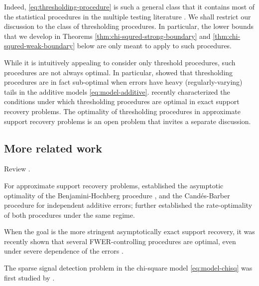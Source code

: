 Indeed, \eqref{eq:thresholding-procedure} is such a general class that it contains most of the statistical procedures in the multiple testing literature \cite{roquain2011type}.
We shall restrict our discussion to the class of thresholding procedures.
In particular, the lower bounds that we develop in Theorems \ref{thm:chi-squred-strong-boundary} and \ref{thm:chi-squred-weak-boundary} below are only meant to apply to such procedures.

\begin{remark}
While it is intuitively appealing to consider only threshold procedures, such procedures are not always optimal.
In particular, \citet{chen2018scan} showed that thresholding procedures are in fact sub-optimal when errors have heavy (regularly-varying) tails in the additive models \eqref{eq:model-additive}. 
\citet{gao2018fundamental} recently characterized the conditions under which thresholding procedures are optimal in exact support recovery problems.
The optimality of thresholding procedures in approximate support recovery problems is an open problem that invites a separate discussion.
\end{remark}


\subsection{More related work}

Review \cite{jin2014optimality, jin2016rare, butucea2018variable, arias2017distribution, gao2018fundamental, ji2012ups, rabinovich2017optimal}.


For approximate support recovery problems, \citet*{arias2017distribution} established the asymptotic optimality of the Benjamini-Hochberg procedure \cite{benjamini1995controlling}, and the Cand\'es-Barber procedure \cite{barber2015controlling} for independent additive errors;
\citet{rabinovich2017optimal} further established the rate-optimality of both procedures under the same regime.

When the goal is the more stringent asymptotically exact support recovery, it was recently shown that several FWER-controlling procedures are optimal, even under severe dependence of the errors \cite{gao2018fundamental}.

The sparse signal detection problem in the chi-square model \eqref{eq:model-chisq} was first studied by \cite{donoho2004higher}.


\cite{gao2019upass}

